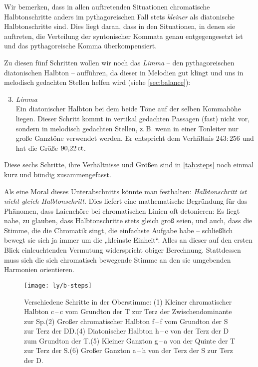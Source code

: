Wir bemerken, dass in allen auftretenden Situationen chromatische
Halbtonschritte anders im pythagoreischen Fall stets \emph{kleiner} als
diatonische Halbtonschritte sind.  Dies liegt daran, dass in den Situationen,
in denen sie auftreten, die Verteilung der syntonischer Kommata genau
entgegengesetzt ist und das pythagoreische Komma überkompensiert.

Zu diesen fünf Schritten wollen wir noch das \emph{Limma} -- den pythagoreischen
diatonischen Halbton -- aufführen, da dieser in Melodien gut klingt und uns in
melodisch gedachten Stellen helfen wird (siehe \cref{sec:balance}):

\begin{enumerate}\setcounter{enumi}{2}
  \item \emph{Limma}\\
  Ein diatonischer Halbton bei dem beide Töne auf der selben Kommahöhe liegen.
  Dieser Schritt kommt in vertikal gedachten Passagen (fast) nicht vor, sondern
  in melodisch gedachten Stellen, z.\,B. wenn in einer Tonleiter nur große
  Ganztöne verwendet werden. Er entspricht dem Verhältnis $243:256$ und hat die
  Größe $90{,}22\,\text{ct}$.
\end{enumerate}


Diese sechs Schritte, ihre Verhältnisse und Größen sind in \cref{tab:steps} noch
einmal kurz und bündig zusammengefasst.

Als eine Moral dieses Unterabschnitts könnte man festhalten:
\emph{Halbtonschritt ist nicht gleich Halbtonschritt.}  Dies liefert eine
mathematische Begründung für das Phänomen, dass Laienchöre bei chromatischen
Linien oft detonieren: Es liegt nahe, zu glauben, dass Halbtonschritte stets
gleich groß seien, und auch, dass die Stimme, die die Chromatik singt, die
einfachste Aufgabe habe – schließlich bewegt sie sich ja immer um die „kleinste
Einheit“. Alles an dieser auf den ersten Blick einleuchtenden Vermutung
widerspricht obiger Berechnung.  Stattdessen muss sich die sich chromatisch
bewegende Stimme an den sie umgebenden Harmonien orientieren.

\begin{figure}
  \centering
  \texttt{[image: ly/b-steps]}
  \caption{Verschiedene Schritte in der Oberstimme: (1) Kleiner chromatischer
    Halbton c\,–\,\sharpmm c vom Grundton der T zur Terz der Zwischendominante
    zur Sp.\quad (2) Großer chromatischer Halbton f\,–\,\sharpm f vom Grundton
    der S zur Terz der DD.\quad (4) Diatonischer Halbton \naturalm h\,–\,c von
    der Terz der D zum Grundton der T.\quad (5) Kleiner Ganzton
    g\,–\,\naturalm a von der Quinte der T zur Terz der S.\quad (6) Großer
    Ganzton \naturalm a\,–\,\naturalm h von der Terz der S zur Terz der
    D.}\label{fig:steps}
\end{figure}

